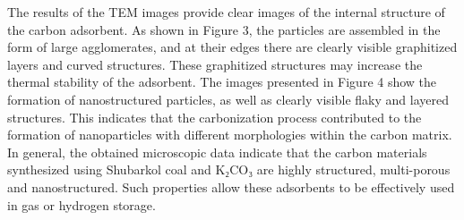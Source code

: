 The results of the TEM images provide clear images of the internal
structure of the carbon adsorbent. As shown in Figure 3, the particles
are assembled in the form of large agglomerates, and at their edges
there are clearly visible graphitized layers and curved structures.
These graphitized structures may increase the thermal stability of the
adsorbent. The images presented in Figure 4 show the formation of
nanostructured particles, as well as clearly visible flaky and layered
structures. This indicates that the carbonization process contributed to
the formation of nanoparticles with different morphologies within the
carbon matrix. In general, the obtained microscopic data indicate that
the carbon materials synthesized using Shubarkol coal and K₂CO₃ are
highly structured, multi-porous and nanostructured. Such properties
allow these adsorbents to be effectively used in gas or hydrogen
storage.




